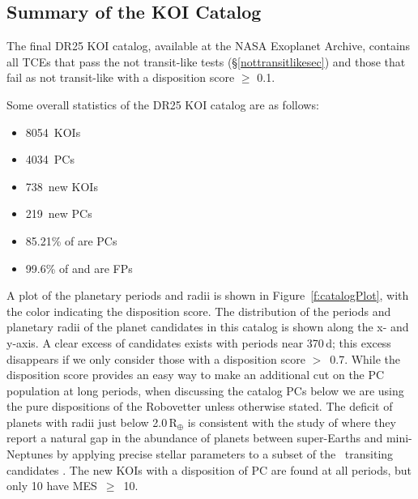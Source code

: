 \def \nkois {8054}
\def \ncand {4034}
\def \newkois {738}
\def \newcand {219}
\def \completeness {85.21}
\def \reliability {97.14}
\def \effectiveness {99.6}

\subsection{Summary of the KOI Catalog}

The final DR25 KOI catalog, available at the NASA Exoplanet Archive, contains all TCEs that pass the not transit-like tests (\S\ref{nottransitlikesec}) and those that fail as not transit-like with a disposition score $\ge$ 0.1. 


Some overall statistics of the DR25 KOI catalog are as follows:
\begin{itemize}
    \item \nkois{}~KOIs
    \item \ncand{}~PCs
    \item \newkois{}~new KOIs
    \item \newcand{}~new PCs
    \item \completeness{}\% of  are PCs
    \item \effectiveness{}\% of  and  are FPs
\end{itemize}

A plot of the planetary periods and radii is shown in Figure~\ref{f:catalogPlot}, with the color indicating the disposition score. The distribution of the periods and planetary radii of the planet candidates in this catalog is shown along the x- and y-axis. A clear excess of candidates exists with periods near 370\,d;  this excess disappears if we only consider those with a disposition score $>$~0.7. While the disposition score provides an easy way to make an additional cut on the PC population at long periods, when discussing the catalog PCs below we are using the pure dispositions of the Robovetter unless otherwise stated. The deficit of planets with radii just below 2.0\,R$_{\oplus}$ is consistent with the study of \citet{Fulton2017} where they report a natural gap in the abundance of planets between super-Earths and mini-Neptunes by applying precise stellar parameters to a subset of the \kepler\ transiting candidates \citep{CKS2,CKS1}. The new KOIs with a disposition of PC are found at all periods, but only 10 have MES~$\geq$~10.


